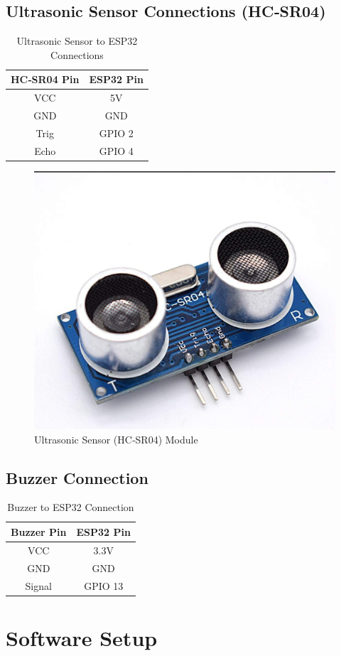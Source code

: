\documentclass[conference]{IEEEtran}
\begin{document}
\subsection{Ultrasonic Sensor Connections (HC‑SR04)}
\begin{table}[!ht]
\centering
\caption{Ultrasonic Sensor to ESP32 Connections}
\begin{tabular}{|c|c|}
\hline
\textbf{HC‑SR04 Pin} & \textbf{ESP32 Pin} \\
\hline
VCC & 5V \\
GND & GND \\
Trig & GPIO 2 \\
Echo & GPIO 4 \\
\hline
\end{tabular}
\end{table}

\begin{figure}[h!]
\centering
\includegraphics[width=0.4\linewidth]{ultrasonic_sensor.jpg}
\caption{Ultrasonic Sensor (HC‑SR04) Module}
\label{fig:ultrasonic}
\end{figure}

\subsection{Buzzer Connection}
\begin{table}[!ht]
\centering
\caption{Buzzer to ESP32 Connection}
\begin{tabular}{|c|c|}
\hline
\textbf{Buzzer Pin} & \textbf{ESP32 Pin} \\
\hline
VCC    & 3.3V \\
GND    & GND \\
Signal & GPIO 13 \\
\hline
\end{tabular}
\end{table}

\section{Software Setup}
\end{document}
